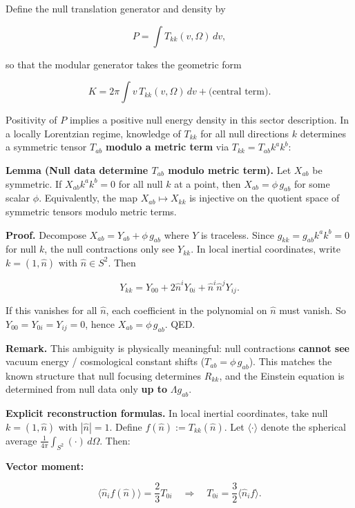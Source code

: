 Define the null translation generator and density by

\[
P = \int T_{kk}(v,\Omega)\,dv,
\]

so that the modular generator takes the geometric form

\[
K = 2\pi \int v\,T_{kk}(v,\Omega)\,dv + \text{(central term)}.
\]

Positivity of \(P\) implies a positive null energy density in this sector description. In a locally Lorentzian regime, knowledge of \(T_{kk}\) for all null directions \(k\) determines a symmetric tensor \(T_{ab}\) \textbf{modulo a metric term} via \(T_{kk} = T_{ab} k^a k^b\):

\textbf{Lemma (Null data determine \(T_{ab}\) modulo metric term).} Let \(X_{ab}\) be symmetric. If \(X_{ab} k^a k^b = 0\) for all null \(k\) at a point, then \(X_{ab} = \phi \, g_{ab}\) for some scalar \(\phi\). Equivalently, the map \(X_{ab} \mapsto X_{kk}\) is injective on the quotient space of symmetric tensors modulo metric terms.

\textbf{Proof.} Decompose \(X_{ab} = Y_{ab} + \phi \, g_{ab}\) where \(Y\) is traceless. Since \(g_{kk} = g_{ab} k^a k^b = 0\) for null \(k\), the null contractions only see \(Y_{kk}\). In local inertial coordinates, write \(k = (1, \hat{n})\) with \(\hat{n} \in S^2\). Then

\[
Y_{kk} = Y_{00} + 2 \hat{n}^i Y_{0i} + \hat{n}^i \hat{n}^j Y_{ij}.
\]

If this vanishes for all \(\hat{n}\), each coefficient in the polynomial on \(\hat{n}\) must vanish. So \(Y_{00} = Y_{0i} = Y_{ij} = 0\), hence \(X_{ab} = \phi \, g_{ab}\). QED.

\textbf{Remark.} This ambiguity is physically meaningful: null contractions \textbf{cannot see} vacuum energy / cosmological constant shifts (\(T_{ab} = \phi \, g_{ab}\)). This matches the known structure that null focusing determines \(R_{kk}\), and the Einstein equation is determined from null data only \textbf{up to} \(\Lambda g_{ab}\).

\textbf{Explicit reconstruction formulas.} In local inertial coordinates, take null \(k = (1, \hat{n})\) with \(|\hat{n}| = 1\). Define \(f(\hat{n}) := T_{kk}(\hat{n})\). Let \(\langle \cdot \rangle\) denote the spherical average \(\frac{1}{4\pi} \int_{S^2} (\cdot) \, d\Omega\). Then:

\textbf{Vector moment:}

\[
\langle \hat{n}_i f(\hat{n}) \rangle = \frac{2}{3} T_{0i}
\quad \Rightarrow \quad
T_{0i} = \frac{3}{2} \langle \hat{n}_i f \rangle.
\]

